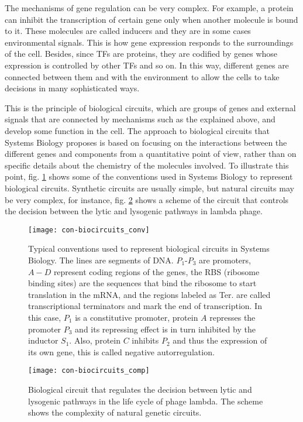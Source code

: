 The mechanisms of gene regulation can be very complex. For example, a protein can inhibit the transcription of certain gene only when another molecule is bound to it. These molecules are called inducers and they are in some cases environmental signals. This is how gene expression responds to the surroundings of the cell. Besides, since TFs are proteins, they are codified by genes whose expression is controlled by other TFs and so on. In this way, different genes are connected between them and with the environment to allow the cells to take decisions in many sophisticated ways.

This is the principle of biological circuits, which are groups of genes and external signals that are connected by mechanisms such as the explained above, and develop some function in the cell. The approach to biological circuits that Systems Biology proposes is based on focusing on the interactions between the different genes and components from a quantitative point of view, rather than on specific details about the chemistry of the molecules involved. To illustrate this point, fig. \ref{fig:con-biocircuits_conv} shows some of the conventions used in Systems Biology to represent biological circuits. Synthetic circuits are usually simple, but natural circuits may be very complex, for instance, fig. \ref{fig:con-biocircuits_comp} shows a scheme of the circuit that controls the decision between the lytic and lysogenic pathways in lambda phage.

\begin{figure}[H]
  \centering
  \texttt{[image: con-biocircuits\_conv]}
  \caption[Conventions used to represent biological circuits]{\label{fig:con-biocircuits_conv} Typical conventions used to represent biological circuits in Systems Biology. The lines are segments of DNA. $P_1$-$P_3$ are promoters, $A-D$ represent coding regions of the genes, the RBS (ribosome binding sites) are the sequences that bind the ribosome to start translation in the mRNA, and the regions labeled as Ter. are called transcriptional terminators and mark the end of transcription. In this case, $P_1$ is a constitutive promoter, protein $A$ represses the promoter $P_3$ and its repressing effect is in turn inhibited by the inductor $S_1$. Also, protein $C$ inhibits $P_2$ and thus the expression of its own gene, this is called negative autorregulation.}
\end{figure}

\begin{figure}[H]
  \centering
  \texttt{[image: con-biocircuits\_comp]}
  \caption[Example of a biological circuit]{\label{fig:con-biocircuits_comp} Biological circuit that regulates the decision between lytic and lysogenic pathways in the life cycle of phage lambda. The scheme shows the complexity of natural genetic circuits.}
\end{figure}

